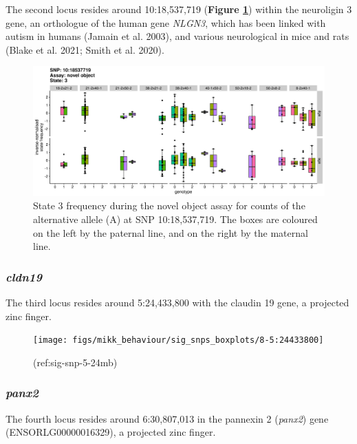 \documentclass[
]{book}
\begin{document}
The second locus resides around 10:18,537,719 (\textbf{Figure \ref{fig:sig-snp-10-18mb}}) within the neuroligin 3 gene, an orthologue of the human gene \emph{NLGN3}, which has been linked with autism in humans (Jamain et al. 2003), and various neurological in mice and rats (Blake et al. 2021; Smith et al. 2020).



\begin{figure}
\includegraphics[width=1\linewidth]{figs/mikk_behaviour/sig_snps_boxplots/3-10:18537719} \caption{State 3 frequency during the novel object assay for counts of the alternative allele (A) at SNP 10:18,537,719. The boxes are coloured on the left by the paternal line, and on the right by the maternal line.}\label{fig:sig-snp-10-18mb}
\end{figure}

\hypertarget{cldn19}{%
\subsubsection{\texorpdfstring{\emph{cldn19}}{cldn19}}\label{cldn19}}

The third locus resides around 5:24,433,800 with the claudin 19 gene, a projected zinc finger.

\begin{figure}
\texttt{[image: figs/mikk\_behaviour/sig\_snps\_boxplots/8-5:24433800]} \caption{(ref:sig-snp-5-24mb)}\label{fig:sig-snp-5-24mb}
\end{figure}

\hypertarget{panx2}{%
\subsubsection{\texorpdfstring{\emph{panx2}}{panx2}}\label{panx2}}

The fourth locus resides around 6:30,807,013 in the pannexin 2 (\emph{panx2}) gene (ENSORLG00000016329), a projected zinc finger.
\end{document}
